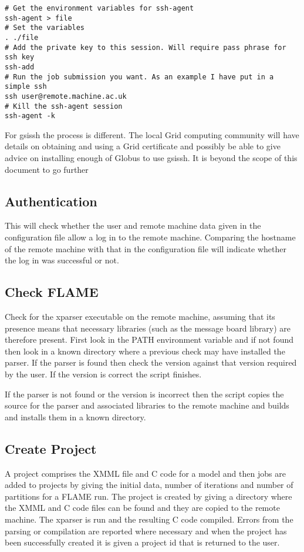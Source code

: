 \begin{verbatim}
# Get the environment variables for ssh-agent
ssh-agent > file
# Set the variables
. ./file
# Add the private key to this session. Will require pass phrase for ssh key
ssh-add
# Run the job submission you want. As an example I have put in a simple ssh
ssh user@remote.machine.ac.uk
# Kill the ssh-agent session
ssh-agent -k	
\end{verbatim}


For gsissh the process is different. The local Grid computing community will have details on obtaining and using a Grid certificate and possibly be able to give advice on installing enough of Globus to use gsissh. It is beyond the scope of this document to go further

\subsection{Authentication}

This will check whether the user and remote machine data given in the configuration file allow a log in to the remote machine. Comparing the hostname of the remote machine with that in the configuration file will indicate whether the log in was successful or not.

\subsection{Check FLAME}

Check for the xparser executable on the remote machine, assuming that its presence means that necessary libraries (such as the message board library) are therefore present. First look in the PATH environment variable and if not found then look in a known directory where a previous check may have installed the parser. If the parser is found then check the version against that version required by the user. If the version is correct the script finishes. 

If the parser is not found or the version is incorrect then the script copies the source for the parser and associated libraries to the remote machine and builds and installs them in a known directory.

\subsection{Create Project}

A project comprises the XMML file and C code for a model and then jobs are added to projects by giving the initial data, number of iterations and number of partitions for a FLAME run. The project is created by giving a directory where the XMML and C code files can be found and they are copied to the remote machine. The xparser is run and the resulting C code compiled. Errors from the parsing or compilation are reported where necessary and when the project has been successfully created it is given a project id that is returned to the user. 

